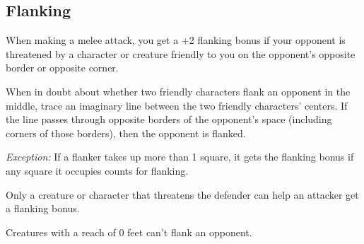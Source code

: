 \subsection{Flanking}
When making a melee attack, you get a +2 flanking bonus if your opponent is threatened by a character or creature friendly to you on the opponent's opposite border or opposite corner.

When in doubt about whether two friendly characters flank an opponent in the middle, trace an imaginary line between the two friendly characters' centers. If the line passes through opposite borders of the opponent's space (including corners of those borders), then the opponent is flanked.

\textit{Exception:} If a flanker takes up more than 1 square, it gets the flanking bonus if any square it occupies counts for flanking.

Only a creature or character that threatens the defender can help an attacker get a flanking bonus.

Creatures with a reach of 0 feet can't flank an opponent.
